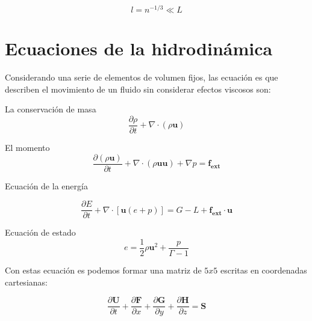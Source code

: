 \documentclass[12pt,a4paper]{book}
\begin{document}
\begin{equation}
l = n^{-1/3} \ll L
\end{equation}



\section{Ecuaciones de la hidrodinámica}

Considerando una serie de elementos de volumen fijos, las ecuación  es que describen el movimiento de un fluido sin considerar efectos viscosos son:

La conservación de masa
\begin{equation} \label{conservación_masa_hidrodinamica}
\dfrac{\partial \rho }{\partial t} + \nabla \cdot \left( \rho \mathbf{u} \right)
\end{equation}

El momento
\begin{equation}  \label{conservación  _momento_hidrodinamica}
\dfrac{\partial \left( \rho \mathbf{u} \right) }{\partial t}+ \nabla \cdot \left( \rho \mathbf{u u} \right) + \nabla p = \mathbf{f_{ext}}
\end{equation}

Ecuación de la energía

\begin{equation} \label{conservación  _energia_hidrodinamica}
\dfrac{\partial E }{\partial t} + \nabla \cdot \left[ \mathbf{u} \left( e+p \right) \right] =G-L+\mathbf{f_{ext} \cdot \mathbf{u}}
\end{equation}

Ecuación de estado
\begin{equation}
e=\frac{1}{2} \rho \mathbf{u}^{2} + \frac{p}{\Gamma - 1}
\end{equation}

Con estas ecuación  es podemos formar una matriz de $5x5$ escritas en coordenadas cartesianas:

\begin{equation} \label{euler_cartesianas}
\dfrac{\partial \mathbf{U}}{\partial t}+\dfrac{\partial \mathbf{F}}{\partial x}+\dfrac{\partial \mathbf{G}}{\partial y}+\dfrac{\partial \mathbf{H}}{\partial z}= \mathbf{S}
\end{equation}
\end{document}
